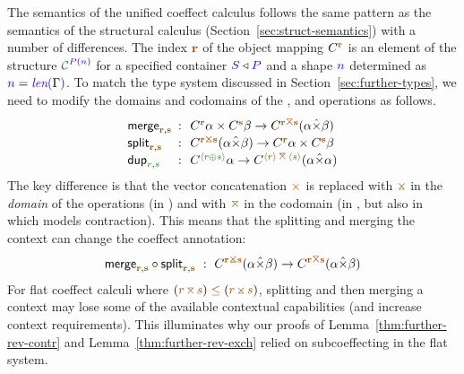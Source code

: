 The semantics of the unified coeffect calculus follows the same pattern as the semantics of the
structural calculus (Section~\ref{sec:struct-semantics}) with a number of differences. The
index $\aclrd{\textbf{r}}$ of the object mapping $\ctyp{\aclrd{\textbf{r}}}$ is an element of
the structure $\C^{\SP(\sclrd{n})}$ for a specified container $\SH \triangleleft \SP$ and a shape
$\sclrd{n}$ determined as $\sclrd{n} = \slen{\Gamma}$. To match the type system discussed in
Section~\ref{sec:further-types}, we need to modify the domains and codomains of the ,
 and  operations as follows.
%
\begin{equation*}
\begin{array}{lcl}
 \ident{merge}_{\aclrd{\textbf{r}},\aclrd{\textbf{s}}} &\narrow{:}&
  \ctyp{\aclrd{\textbf{r}}}{\alpha} \times \ctyp{\aclrd{\textbf{s}}}{\beta} \rightarrow \ctyp{\aclrd{\textbf{r}}\azip\aclrd{\textbf{s}}}{(\alpha \xtimes \beta)} \\
 \ident{split}_{\aclrd{\textbf{r}},\aclrd{\textbf{s}}} &\narrow{:}&
  \ctyp{\aclrd{\textbf{r}}\apar\aclrd{\textbf{s}}}{(\alpha \xtimes \beta)} \rightarrow \ctyp{\aclrd{\textbf{r}}}{\alpha} \times \ctyp{\aclrd{\textbf{s}}}{\beta} \\
 \ident{dup}_{\cclrd{r}, \cclrd{s}} &\narrow{:}&
  \ctyp{\alift{\cclrd{r} \cpar \cclrd{s}}}{\alpha} \rightarrow \ctyp{\alift{\cclrd{r}}\,\azip\,\alift{\cclrd{s}}}{(\alpha \xtimes \alpha)} \\
\end{array}
\end{equation*}
%
The key difference is that the vector concatenation $\atimes$ is replaced with $\apar$ in the
\emph{domain} of the operations (in ) and with $\azip$ in the codomain
(in , but also in  which models contraction).
This means that the splitting and merging the context can change the coeffect annotation:
%
\begin{equation*}
\ident{merge}_{\aclrd{\textbf{r}},\aclrd{\textbf{s}}} \circ \ident{split}_{\aclrd{\textbf{r}},\aclrd{\textbf{s}}} ~:~
  \ctyp{\aclrd{\textbf{r}}\apar\aclrd{\textbf{s}}}{(\alpha \xtimes \beta)}
  \rightarrow \ctyp{\aclrd{\textbf{r}}\azip\aclrd{\textbf{s}}}{(\alpha \xtimes \beta)}
\end{equation*}
%
For flat coeffect calculi where $(\aclrd{r}\,\azip\,\aclrd{s}) \;\aclrd{\leq}\; (\aclrd{r}\,\apar\,\aclrd{s})$,
splitting and then merging a context may lose some of the available contextual capabilities
(and increase context requirements). This illuminates why our proofs of Lemma~\ref{thm:further-rev-contr}
and Lemma~\ref{thm:further-rev-exch} relied on subcoeffecting in the flat system.

